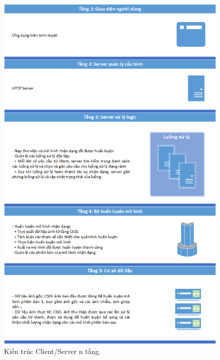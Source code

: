 \begin{figure}[H]
	\centering
	\includegraphics[width=0.72\linewidth]{images/client_server_ntang}
	\caption{Kiến trúc Client/Server n tầng.}
	\label{fig:client_server_ntang}
\end{figure}

